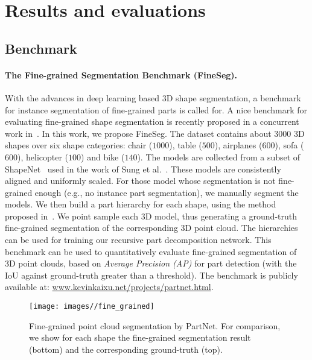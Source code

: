 

\section{Results and evaluations}


\subsection{Benchmark}

\paragraph{The Fine-grained Segmentation Benchmark (FineSeg).}
With the advances in deep learning based 3D shape segmentation, a benchmark for instance segmentation of fine-grained parts is called for. A nice benchmark for evaluating fine-grained shape segmentation is recently proposed in a concurrent work in~\cite{mo2018partnet}. In this work, we propose FineSeg. The dataset contains about $3000$ 3D shapes over six shape categories: chair ($1000$), table ($500$), airplanes ($600$), sofa ($600$), helicopter ($100$) and bike ($140$). The models are collected from a subset of ShapeNet~\cite{Shapenet} used in the work of Sung et al.~\cite{sung2017}. These models are consistently aligned and uniformly scaled. For those model whose segmentation is not fine-grained enough (e.g., no instance part segmentation), we manually segment the models. We then build a part hierarchy for each shape, using the method proposed in~\cite{wang2011symmetry}.
We point sample each 3D model, thus generating a ground-truth fine-grained segmentation of the corresponding 3D point cloud. The hierarchies can be used for training our recursive part decomposition network. This benchmark can be used to quantitatively evaluate fine-grained segmentation of 3D point clouds, based on \emph{Average Precision (AP)} for part detection (with the IoU against ground-truth greater than a threshold).
The benchmark is publicly available at: \url{www.kevinkaixu.net/projects/partnet.html}.

\begin{figure*}[htbp]
  \centering
  \texttt{[image: images//fine\_grained]}
  \caption{Fine-grained point cloud segmentation by PartNet. For comparison, we show for each shape the fine-grained segmentation result (bottom) and the corresponding ground-truth (top).}
  \label{fine_grained}
\end{figure*}






